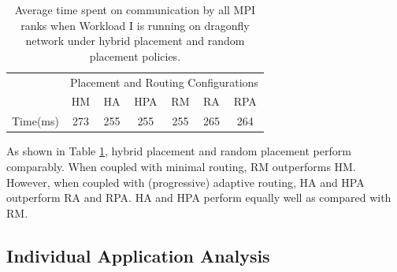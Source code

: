 \documentclass[conference,compsoc]{IEEEtran}
\begin{document}
\begin{table}[ht]
\begin{center}
\caption{Average time spent on communication by all MPI ranks when Workload I is running on dragonfly network under hybrid placement and random placement policies.} 
\label{tab: hyb-placement-wkld-commtime}
\begin{tabular}{l c c c c c c }
\toprule %
\toprule
&\multicolumn{6}{c}{Placement and Routing Configurations} \\
\cmidrule(l){2-7}
	      & HM & HA & HPA & RM & RA & RPA \\ %
\midrule %
Time(ms)  &273 &255 &255 &255 &265 &264  \\ %
\midrule %
\bottomrule %
\end{tabular}
\end{center}
\end{table}


As shown in Table \ref{tab: hyb-placement-wkld-commtime}, hybrid placement and random placement perform comparably. When coupled with minimal routing, RM outperforms HM. However, when coupled with (progressive) adaptive routing, HA and HPA outperform RA and RPA. HA and HPA perform equally well as compared with RM.  


\subsection{Individual Application Analysis}
\end{document}
